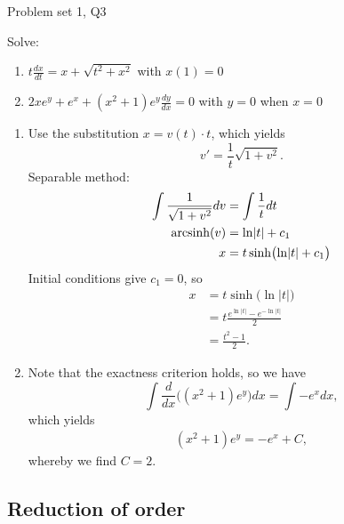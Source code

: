 \begin{problem}{Problem set 1, Q3}{}


    Solve:
    \begin{enumerate}
        \item $t \frac{dx}{dt} = x + \sqrt{t^2 + x^2}$ with $x(1) = 0$
        \item $2xe^y + e^x + (x^2 + 1) e^y \frac{dy}{dx} = 0$ with $y = 0$ when $x = 0$
    \end{enumerate}

    \tcblower

    \begin{enumerate}
        \item Use the substitution $x = v(t) \cdot t$, which yields
            $$ v' = \frac{1}{t} \sqrt{1 + v^2} . $$
        Separable method:
            \begin{align*}
                \int \frac{1}{\sqrt{1 + v^2}} dv 
                    &= \int \frac{1}{t} dt \\
                \operatorname{arcsinh}(v) &= \ln \lvert t \rvert + c_1 \\
                x &= t \sinh \bigl( \ln \lvert t \rvert + c_1 \bigr)
            \end{align*}
        Initial conditions give $c_1 = 0$, so
            \begin{align*}
                x &= t \sinh \bigl( \ln \lvert t \rvert \bigr) \\
                &= t \frac{e^{\ln \lvert t \rvert}
                    - e^{-\ln \lvert t \rvert}}{2} \\
                &= \frac{t^2 - 1}{2} .
            \end{align*}
        \item {} Note that the exactness criterion holds, so we have
            $$ \int \frac{d}{dx} \bigl( 
                    (x^2 + 1)e^y \bigr) dx 
                    = \int -e^x dx , $$
        which yields
            \begin{align*}
                (x^2 + 1) e^y = -e^x + C ,
            \end{align*}
        whereby we find $C = 2$.
    \end{enumerate}

\end{problem}

\subsection{Reduction of order}

